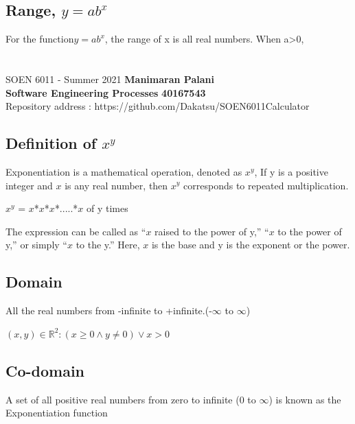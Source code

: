 \documentclass[letterpaper, 11pt]{report}
\begin{document}
\subsection*{ Range,  \(y=ab^x\) } 
For the function\(y=ab^x\), the range of x is all real numbers. When a>0, 


\pagebreak
\newcommand{\R}{\mathbb{R}}
\renewcommand{\labelitemi}{$\star$}
\section*{}
\normalsize {SOEN 6011 - Summer 2021} \hfill \textbf{Manimaran Palani} \\
\textbf{ Software Engineering Processes}  \hfill \textbf{40167543} \\
\hfill Repository address : https://github.com/Dakatsu/SOEN6011Calculator
\subsection*{Definition of \(x^y\)}
\cite{mathInsight} Exponentiation is a mathematical operation, denoted as \(x^y\), If y is a positive integer and \(x\) is any real number, then \(x^y\) corresponds to repeated multiplication.
 \begin{center} \(x^y\) = \(x\)*\(x\)*\(x\)*.....*\(x\) of y times \end{center}
The expression can be called as “\(x\) raised to the power of y,” “\(x\) to the power of y,” or simply “\(x\) to the y.” Here, \(x\) is the base and y is the exponent or the power.
\subsection*{Domain}
\cite{mathbits} All the real numbers from -infinite to +infinite.(-\(\infty\) to \(\infty\))
 \begin{center} $(x,y) \in \R^2 : (x \geq 0 \land y \neq 0) \lor x>0$ \end{center}
\subsection*{Co-domain}
A set of all positive real numbers from zero to infinite (0 to \(\infty\)) is known as the Exponentiation function
\end{document}
